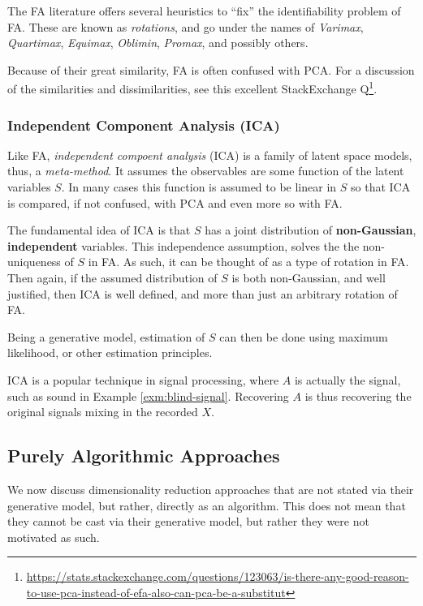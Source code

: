 \documentclass[]{book}
\renewcommand{\href}[2]{#2\footnote{\url{#1}}}
\theoremstyle{definition}
\theoremstyle{definition}
\theoremstyle{definition}
\theoremstyle{remark}
\begin{document}
The FA literature offers several heuristics to ``fix'' the identifiability problem of FA.
These are known as \emph{rotations}, and go under the names of \emph{Varimax}, \emph{Quartimax}, \emph{Equimax}, \emph{Oblimin}, \emph{Promax}, and possibly others.

Because of their great similarity, FA is often confused with PCA.
For a discussion of the similarities and dissimilarities, see this excellent \href{https://stats.stackexchange.com/questions/123063/is-there-any-good-reason-to-use-pca-instead-of-efa-also-can-pca-be-a-substitut}{StackExchange Q}.

\hypertarget{independent-component-analysis-ica}{%
\subsubsection{Independent Component Analysis (ICA)}\label{independent-component-analysis-ica}}

Like FA, \emph{independent compoent analysis} (ICA) is a family of latent space models, thus, a \emph{meta-method}.
It assumes the observables are some function of the latent variables \(S\).
In many cases this function is assumed to be linear in \(S\) so that ICA is compared, if not confused, with PCA and even more so with FA.

The fundamental idea of ICA is that \(S\) has a joint distribution of \textbf{non-Gaussian}, \textbf{independent} variables.
This independence assumption, solves the the non-uniqueness of \(S\) in FA.
As such, it can be thought of as a type of rotation in FA.
Then again, if the assumed distribution of \(S\) is both non-Gaussian, and well justified, then ICA is well defined, and more than just an arbitrary rotation of FA.

Being a generative model, estimation of \(S\) can then be done using maximum likelihood, or other estimation principles.

ICA is a popular technique in signal processing, where \(A\) is actually the signal, such as sound in Example \ref{exm:blind-signal}.
Recovering \(A\) is thus recovering the original signals mixing in the recorded \(X\).

\hypertarget{purely-algorithmic-approaches}{%
\subsection{Purely Algorithmic Approaches}\label{purely-algorithmic-approaches}}

We now discuss dimensionality reduction approaches that are not stated via their generative model, but rather, directly as an algorithm.
This does not mean that they cannot be cast via their generative model, but rather they were not motivated as such.
\end{document}
